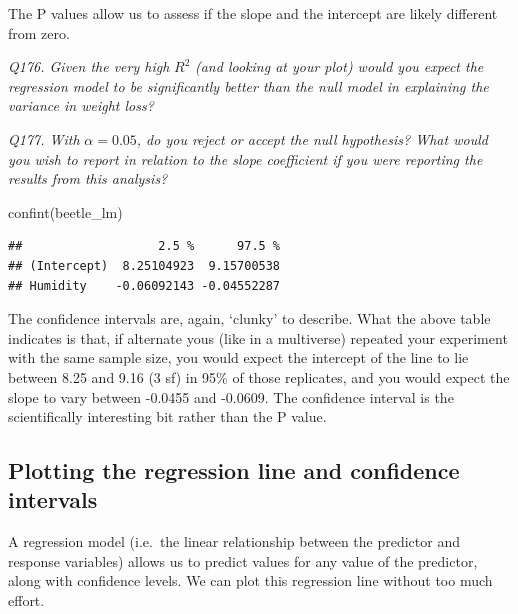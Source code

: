 \documentclass[
  11pt,
  a4paper,
]{book}
\newenvironment{Shaded}{\begin{snugshade}}{\end{snugshade}}
\newcommand{\FunctionTok}[1]{\textcolor[rgb]{0.00,0.00,0.00}{#1}}
\newcommand{\NormalTok}[1]{#1}
\begin{document}
The P values allow us to assess if the slope and the intercept are likely different from zero.

\emph{Q176. Given the very high} \(R^2\) \emph{(and looking at your plot) would you expect the regression model to be significantly better than the null model in explaining the variance in weight loss?}

\emph{Q177. With} \(\alpha = 0.05\)\emph{, do you reject or accept the null hypothesis? What would you wish to report in relation to the slope coefficient if you were reporting the results from this analysis?}

\begin{Shaded}
\begin{Highlighting}[]
\FunctionTok{confint}\NormalTok{(beetle\_lm)}
\end{Highlighting}
\end{Shaded}

\begin{verbatim}
##                   2.5 %      97.5 %
## (Intercept)  8.25104923  9.15700538
## Humidity    -0.06092143 -0.04552287
\end{verbatim}

The confidence intervals are, again, `clunky' to describe. What the above table indicates is that, if alternate yous (like in a multiverse) repeated your experiment with the same sample size, you would expect the intercept of the line to lie between 8.25 and 9.16 (3 sf) in 95\% of those replicates, and you would expect the slope to vary between -0.0455 and -0.0609. The confidence interval is the scientifically interesting bit rather than the P value.

\hypertarget{plotting-the-regression-line-and-confidence-intervals}{%
\subsection{Plotting the regression line and confidence intervals}\label{plotting-the-regression-line-and-confidence-intervals}}

A regression model (i.e.~the linear relationship between the predictor and response variables) allows us to predict values for any value of the predictor, along with confidence levels. We can plot this regression line without too much effort.
\end{document}
